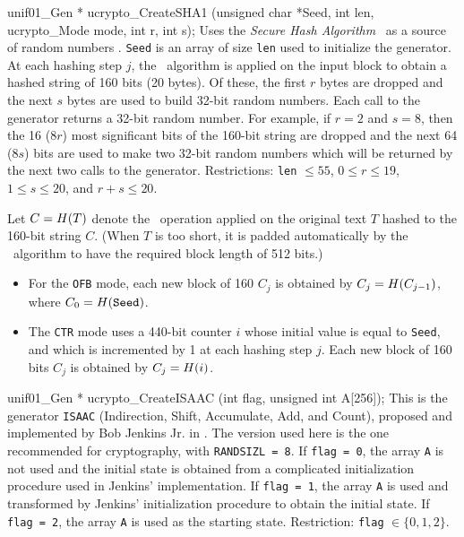 unif01_Gen * ucrypto_CreateSHA1 (unsigned char *Seed, int len,
                                 ucrypto_Mode mode, int r, int s);
\endcode
 \tab Uses the \textit{Secure Hash Algorithm}
  \shaun\ as a source of random numbers \cite{rNIS02a,rBAR06a}.
%
 \texttt{Seed} is an array of size \texttt{len} used to initialize the
  generator. At each hashing step $j$, the \shaun\ algorithm is applied on the
  input block to obtain a hashed string of 160 bits (20 bytes). Of these,
  the first $r$ bytes are dropped and the next $s$ bytes are used to build 32-bit
  random numbers. Each call to the generator returns a 32-bit random number.
  For example, if $r=2$ and $s=8$, then the 16 ($8r$) most significant bits of
  the 160-bit string are dropped and the next 64 ($8s$) bits are used to make
  two 32-bit random numbers which will be returned by the next two
  calls to the generator. Restrictions: \texttt{len} $\le 55$,
  $0 \le r \le 19$, $1 \le s \le 20$, and  $r + s \le 20$.

 Let $C = {H}(T)$ denote the \shaun\  operation applied on the original text $T$
 hashed to the 160-bit string $C$. (When $T$ is too short, it is padded
 automatically by the \shaun\  algorithm to have the required block length of
 512 bits.)
\begin{itemize}
\item  For the \texttt{OFB} mode, each new block of 160 $C_j$ is
  obtained by $C_j = {H}(C_{j-1})$, where $C_0 = {H}(\mbox{\texttt{Seed}})$.

\item The \texttt{CTR} mode uses a 440-bit counter $i$ whose initial value is
  equal to \texttt{Seed}, and which is incremented by 1 at each hashing step $j$.
  Each new block of 160 bits $C_j$ is obtained by
  $C_j = {H}(i)$.
\end{itemize}
 \endtab
\code


unif01_Gen * ucrypto_CreateISAAC (int flag, unsigned int A[256]);
\endcode
  \tab
   This is the generator \texttt{ISAAC}
%
   (Indirection, Shift, Accumulate, Add, and Count),
   proposed and implemented by Bob Jenkins Jr. in \cite{rJEN96a}.
   The version used here is the one recommended for cryptography,
   with  \texttt{RANDSIZL = 8}.
   If \texttt{flag = 0}, the array  \texttt{A} is not used and the initial state
   is obtained from a complicated initialization procedure used in Jenkins'
   implementation.
   If \texttt{flag = 1}, the array \texttt{A} is used and transformed by
   Jenkins' initialization procedure to obtain the initial state.
   If \texttt{flag = 2}, the array  \texttt{A} is used as the starting
   state.  Restriction: \texttt{flag} $\in \{0, 1, 2\}$.
 \endtab


